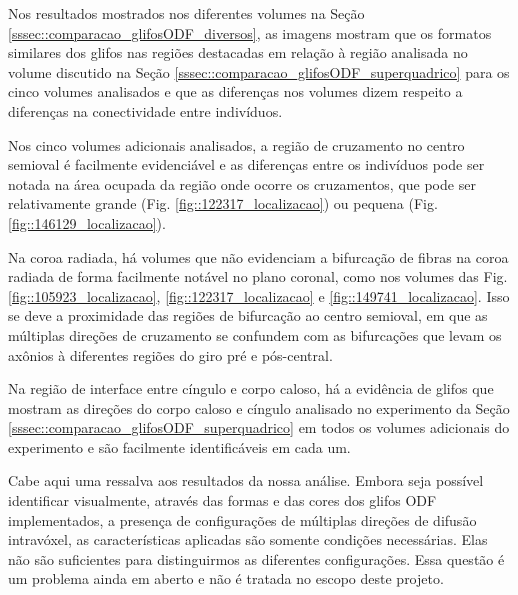 Nos resultados mostrados nos diferentes volumes na Seção \ref{sssec::comparacao_glifosODF_diversos}, as imagens mostram que os formatos similares dos glifos nas regiões destacadas em relação à região analisada no volume discutido na Seção \ref{sssec::comparacao_glifosODF_superquadrico} para os cinco volumes analisados e que as diferenças nos volumes dizem respeito a diferenças na conectividade entre indivíduos.

Nos cinco volumes adicionais analisados, a região de cruzamento no centro semioval é facilmente evidenciável e as diferenças entre os indivíduos pode ser notada na área ocupada da região onde ocorre os cruzamentos, que pode ser relativamente grande (Fig. \ref{fig::122317_localizacao}) ou pequena (Fig. \ref{fig::146129_localizacao}).

Na coroa radiada, há volumes que não evidenciam a bifurcação de fibras na coroa radiada de forma facilmente notável no plano coronal, como nos volumes das Fig. \ref{fig::105923_localizacao}, \ref{fig::122317_localizacao} e \ref{fig::149741_localizacao}. Isso se deve a proximidade das regiões de bifurcação ao centro semioval, em que as múltiplas direções de cruzamento se confundem com as bifurcações que levam os axônios à diferentes regiões do giro pré e pós-central.

Na região de interface entre cíngulo e corpo caloso, há a evidência de glifos que mostram as direções do corpo caloso e cíngulo analisado no experimento da Seção \ref{sssec::comparacao_glifosODF_superquadrico} em todos os volumes adicionais do experimento e são facilmente identificáveis em cada um.


Cabe aqui uma ressalva aos resultados da nossa análise. Embora seja possível identificar visualmente, através das formas e das cores dos glifos ODF implementados, a presença de configurações de múltiplas direções de difusão intravóxel, as características aplicadas são somente condições necessárias. Elas não são suficientes para distinguirmos as diferentes configurações. Essa questão é um problema ainda em aberto \cite{SCHILLING2019194} e não é tratada no escopo deste projeto.

